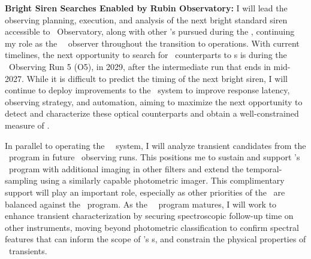 \textbf{Bright Siren Searches Enabled by Rubin Observatory:}
I will lead the observing planning, execution, and analysis of the next bright standard siren accessible to \Rubin\ Observatory, 
along with other \ToO's pursued during the \LSST, continuing my role as the \Rubin\ \ToO\ observer throughout the transition to operations. With current timelines, the next opportunity to search for \EM\ counterparts to \GW s is during the \LVK\ Observing Run 5 (O5), in 2029, after the intermediate run that ends in mid-2027.
While it is difficult to predict the timing of the next bright siren, I will continue to deploy improvements to the \ToO\ system to improve response latency, observing strategy, and automation, aiming to maximize the next opportunity to detect and characterize these 
optical counterparts and obtain a well-constrained measure of \Ho.

In parallel to operating the \Rubin\ \ToO\ system, I will analyze transient candidates from the \DESGW\ program in future \LVK\ observing runs. This positions me to sustain and support \Rubin's \ToO\ program with additional imaging in other filters and extend the temporal-sampling using a similarly capable photometric imager. This complimentary support will play an important role, especially as other priorities of the \LSST\ are balanced against the \ToO\ program.
As the \LSST\ \ToO\ program matures, I will work to enhance transient characterization by securing spectroscopic follow-up time on other instruments, moving beyond photometric classification to confirm spectral features that can inform the scope of \Rubin's \ToO s, and constrain the physical properties of \LSST\ transients.%

